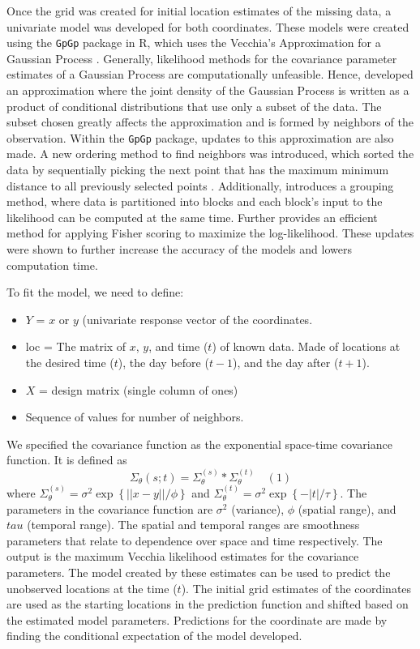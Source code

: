 \documentclass[12pt]{article}
\providecommand{\tightlist}{%
  \setlength{\itemsep}{0pt}\setlength{\parskip}{0pt}}
\begin{document}
Once the grid was created for initial location estimates of the missing
data, a univariate model was developed for both coordinates. These
models were created using the \texttt{GpGp} package in R, which uses the
Vecchia's Approximation for a Gaussian Process \citep{gpgp_pkg}.
Generally, likelihood methods for the covariance parameter estimates of
a Gaussian Process are computationally unfeasible. Hence,
\citet{vecchia1988estimation} developed an approximation where the joint
density of the Gaussian Process is written as a product of conditional
distributions that use only a subset of the data. The subset chosen
greatly affects the approximation and is formed by neighbors of the
observation. Within the \texttt{GpGp} package, updates to this
approximation are also made. A new ordering method to find neighbors was
introduced, which sorted the data by sequentially picking the next point
that has the maximum minimum distance to all previously selected points
\citep{guinness_permutation_2018}. Additionally,
\citet{guinness_permutation_2018} introduces a grouping method, where
data is partitioned into blocks and each block's input to the likelihood
can be computed at the same time. Further \citet{guinness_gaussian_2019}
provides an efficient method for applying Fisher scoring to maximize the
log-likelihood. These updates were shown to further increase the
accuracy of the models and lowers computation time.

To fit the model, we need to define:

\begin{itemize}
\tightlist
\item
  \(Y\) = \(x\) or \(y\) (univariate response vector of the coordinates.
\item
  loc = The matrix of \(x\), \(y\), and time (\(t\)) of known data. Made
  of locations at the desired time (\(t\)), the day before (\(t-1\)),
  and the day after (\(t+1\)).
\item
  \(X\) = design matrix (single column of ones)
\item
  Sequence of values for number of neighbors.
\end{itemize}

We specified the covariance function as the exponential space-time
covariance function. It is defined as
\[\Sigma_{\theta}(s;t) = \Sigma^{(s)}_{\theta}*\Sigma^{(t)}_{\theta} \quad (1)\]
where
\(\Sigma^{(s)}_{\theta} = \sigma^2\exp\left\{||x-y||/\phi\right\}\) and
\(\Sigma^{(t)}_{\theta} = \sigma^2\exp\left\{-|t|/\tau\right\}\). The
parameters in the covariance function are \(\sigma^2\) (variance),
\(\phi\) (spatial range), and \(tau\) (temporal range). The spatial and
temporal ranges are smoothness parameters that relate to dependence over
space and time respectively. The output is the maximum Vecchia
likelihood estimates for the covariance parameters. The model created by
these estimates can be used to predict the unobserved locations at the
time (\(t\)). The initial grid estimates of the coordinates are used as
the starting locations in the prediction function and shifted based on
the estimated model parameters. Predictions for the coordinate are made
by finding the conditional expectation of the model developed.
\end{document}
